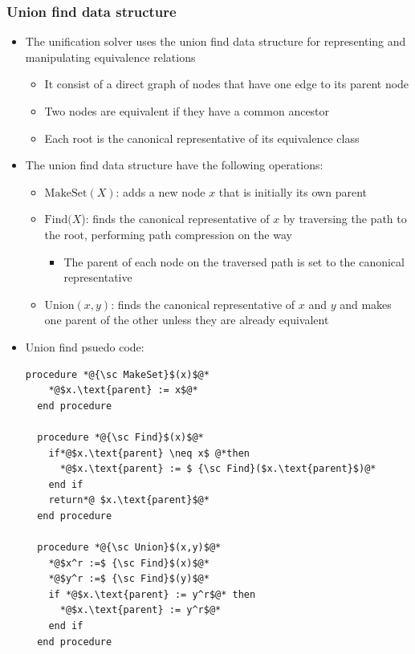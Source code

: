 \subsubsection{Union find data structure}
\begin{itemize}
  \item The unification solver uses the union find data structure for representing and manipulating equivalence relations
  \begin{itemize}
  	\item It consist of a direct graph of nodes that have one edge to its parent node
    \item Two nodes are equivalent if they have a common ancestor
  	\item Each root is the canonical representative of its equivalence class
  \end{itemize}
  \item The union find data structure have the following operations:
  \begin{itemize}
    \item $\text{MakeSet}(X)$: adds a new node $x$ that is initially its own parent
    \item $\text{Find}(X$): finds the canonical representative of $x$ by traversing the path to the root, performing path compression on the way
    \begin{itemize}
      \item The parent of each node on the traversed path is set to the canonical representative
    \end{itemize}
    \item $\text{Union}(x,y)$: finds the canonical representative of $x$ and $y$ and makes one parent of the other unless they are already equivalent 
    \end{itemize}
    \item Union find psuedo code:
\begin{lstlisting}[language = pseudocode]
  procedure *@{\sc MakeSet}$(x)$@*
    *@$x.\text{parent} := x$@*
  end procedure

  procedure *@{\sc Find}$(x)$@*
    if*@$x.\text{parent} \neq x$ @*then
      *@$x.\text{parent} := $ {\sc Find}($x.\text{parent}$)@*
    end if
    return*@ $x.\text{parent}$@*
  end procedure

  procedure *@{\sc Union}$(x,y)$@*
    *@$x^r :=$ {\sc Find}$(x)$@*
    *@$y^r :=$ {\sc Find}$(y)$@*
    if *@$x.\text{parent} := y^r$@* then
      *@$x.\text{parent} := y^r$@*
    end if 
  end procedure
\end{lstlisting}
\end{itemize}


